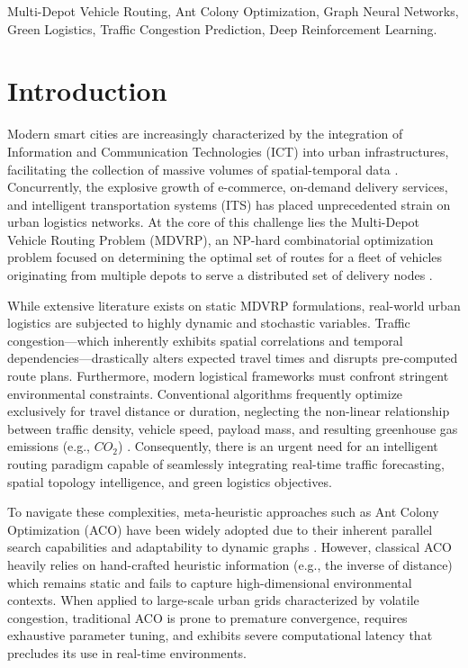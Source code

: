 \documentclass[conference]{IEEEtran}
\begin{document}
\begin{IEEEkeywords}
Multi-Depot Vehicle Routing, Ant Colony Optimization, Graph Neural Networks, Green Logistics, Traffic Congestion Prediction, Deep Reinforcement Learning.
\end{IEEEkeywords}

\section{Introduction}
\label{sec:intro}

Modern smart cities are increasingly characterized by the integration of Information and Communication Technologies (ICT) into urban infrastructures, facilitating the collection of massive volumes of spatial-temporal data \cite{smart_cities_ref1}. Concurrently, the explosive growth of e-commerce, on-demand delivery services, and intelligent transportation systems (ITS) has placed unprecedented strain on urban logistics networks. At the core of this challenge lies the Multi-Depot Vehicle Routing Problem (MDVRP), an NP-hard combinatorial optimization problem focused on determining the optimal set of routes for a fleet of vehicles originating from multiple depots to serve a distributed set of delivery nodes \cite{mdvrp_ref1}. 

While extensive literature exists on static MDVRP formulations, real-world urban logistics are subjected to highly dynamic and stochastic variables. Traffic congestion—which inherently exhibits spatial correlations and temporal dependencies—drastically alters expected travel times and disrupts pre-computed route plans. Furthermore, modern logistical frameworks must confront stringent environmental constraints. Conventional algorithms frequently optimize exclusively for travel distance or duration, neglecting the non-linear relationship between traffic density, vehicle speed, payload mass, and resulting greenhouse gas emissions (e.g., $CO_2$) \cite{green_logistics_ref1}. Consequently, there is an urgent need for an intelligent routing paradigm capable of seamlessly integrating real-time traffic forecasting, spatial topology intelligence, and green logistics objectives.

To navigate these complexities, meta-heuristic approaches such as Ant Colony Optimization (ACO) have been widely adopted due to their inherent parallel search capabilities and adaptability to dynamic graphs \cite{aco_ref1}. However, classical ACO heavily relies on hand-crafted heuristic information (e.g., the inverse of distance) which remains static and fails to capture high-dimensional environmental contexts. When applied to large-scale urban grids characterized by volatile congestion, traditional ACO is prone to premature convergence, requires exhaustive parameter tuning, and exhibits severe computational latency that precludes its use in real-time environments.
\end{document}
